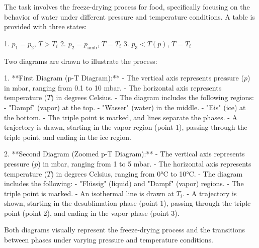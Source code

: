 The task involves the freeze-drying process for food, specifically focusing on the behavior of water under different pressure and temperature conditions. A table is provided with three states:

1. \( p_1 = p_2 \), \( T > T_i \)  
2. \( p_2 = p_{\text{amb}} \), \( T = T_i \)  
3. \( p_3 < T(p) \), \( T = T_i \)  

Two diagrams are drawn to illustrate the process:

1. **First Diagram (p-T Diagram):**  
   - The vertical axis represents pressure (\( p \)) in mbar, ranging from 0.1 to 10 mbar.  
   - The horizontal axis represents temperature (\( T \)) in degrees Celsius.  
   - The diagram includes the following regions:  
     - "Dampf" (vapor) at the top.  
     - "Wasser" (water) in the middle.  
     - "Eis" (ice) at the bottom.  
   - The triple point is marked, and lines separate the phases.  
   - A trajectory is drawn, starting in the vapor region (point 1), passing through the triple point, and ending in the ice region.  

2. **Second Diagram (Zoomed p-T Diagram):**  
   - The vertical axis represents pressure (\( p \)) in mbar, ranging from 1 to 5 mbar.  
   - The horizontal axis represents temperature (\( T \)) in degrees Celsius, ranging from 0°C to 10°C.  
   - The diagram includes the following:  
     - "Flüssig" (liquid) and "Dampf" (vapor) regions.  
     - The triple point is marked.  
     - An isothermal line is drawn at \( T_i \).  
     - A trajectory is shown, starting in the desublimation phase (point 1), passing through the triple point (point 2), and ending in the vapor phase (point 3).  

Both diagrams visually represent the freeze-drying process and the transitions between phases under varying pressure and temperature conditions.
